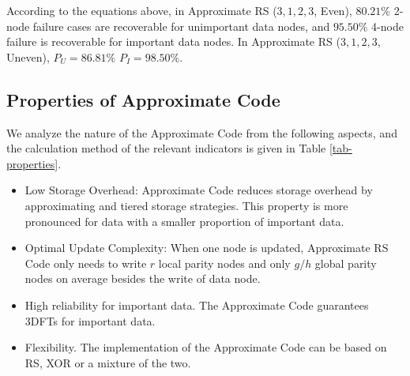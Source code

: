 \documentclass[sigconf]{acmart}
\begin{document}
According to the equations above, in Approximate RS ($3,1,2,3$, Even), $80.21\%$ 2-node failure cases are recoverable for unimportant data nodes, and $95.50\%$ 4-node failure is recoverable for important data nodes. In Approximate RS ($3,1,2,3$, Uneven), $P_U=86.81\%$ $P_{I}=98.50\%$.


\subsection{Properties of Approximate Code}\label{properties}

We analyze the nature of the Approximate Code from the following aspects, and the calculation method of the relevant indicators is given in Table \ref{tab-properties}.
\begin{itemize}
    \item Low Storage Overhead: Approximate Code reduces storage overhead by approximating and tiered storage strategies. This property is more pronounced for data with a smaller proportion of important data.
    \item Optimal Update Complexity: When one node is updated, Approximate RS Code only needs to write $r$ local parity nodes and only $g/h$ global parity nodes on average besides the write of data node.
    \item High reliability for important data. The Approximate Code guarantees 3DFTs for important data.
    \item Flexibility. The implementation of the Approximate Code can be based on RS, XOR or a mixture of the two.
\end{itemize}
\end{document}
